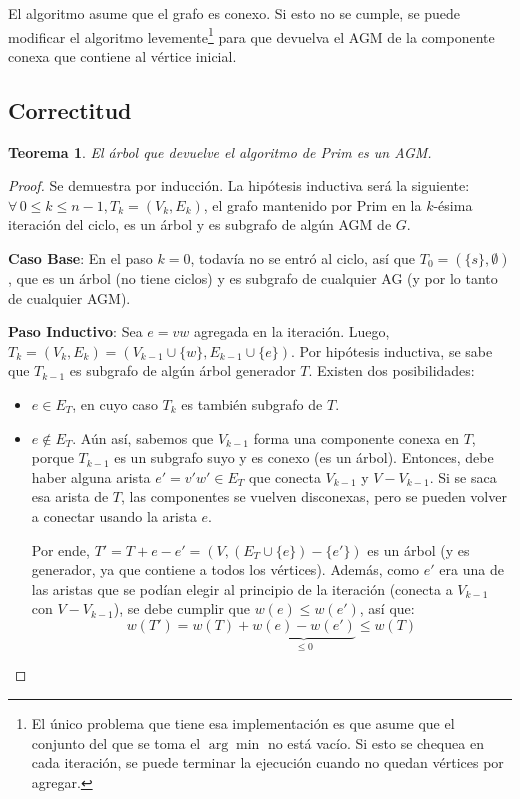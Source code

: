 \documentclass[a4paper]{report}
\newtheorem*{theorem*}{Teorema}
\begin{document}
El algoritmo asume que el grafo es conexo. Si esto no se cumple, se puede modificar el algoritmo levemente\footnote{El único problema que tiene esa implementación es que asume que el conjunto del que se toma el $\arg\min$ no está vacío. Si esto se chequea en cada iteración, se puede terminar la ejecución cuando no quedan vértices por agregar.} para que devuelva el AGM de la componente conexa que contiene al vértice inicial.

\subsection{Correctitud}

\begin{theorem*}
    El árbol que devuelve el algoritmo de Prim es un AGM.
\end{theorem*}
\begin{proof}
    Se demuestra por inducción. La hipótesis inductiva será la siguiente: $\forall\,0 \leq k \leq n - 1, T_k = (V_k, E_k)$, el grafo mantenido por Prim en la $k$-ésima iteración del ciclo, es un árbol y es subgrafo de algún AGM de $G$.

    \textbf{Caso Base}: En el paso $k = 0$, todavía no se entró al ciclo, así que $T_0 = (\{s\}, \emptyset)$, que es un árbol (no tiene ciclos) y es subgrafo de cualquier AG (y por lo tanto de cualquier AGM).

    \textbf{Paso Inductivo}: Sea $e = vw$ agregada en la iteración. Luego, $T_k = (V_k, E_k) = (V_{k - 1} \cup \{w\}, E_{k - 1} \cup \{e\})$. Por hipótesis inductiva, se sabe que $T_{k - 1}$ es subgrafo de algún árbol generador $T$. Existen dos posibilidades:
    \begin{itemize}
        \item $e \in E_T$, en cuyo caso $T_k$ es también subgrafo de $T$.
        \item $e \notin E_T$. Aún así, sabemos que $V_{k - 1}$ forma una componente conexa en $T$, porque $T_{k - 1}$ es un subgrafo suyo y es conexo (es un árbol). Entonces, debe haber alguna arista $e' = v'w' \in E_T$ que conecta $V_{k - 1}$ y $V - V_{k - 1}$. Si se saca esa arista de $T$, las componentes se vuelven disconexas, pero se pueden volver a conectar usando la arista $e$.

              Por ende, $T' = T + e - e' = (V, (E_T \cup \{e\}) - \{e'\})$ es un árbol (y es generador, ya que contiene a todos los vértices). Además, como $e'$ era una de las aristas que se podían elegir al principio de la iteración (conecta a $V_{k - 1}$ con $V - V_{k - 1}$), se debe cumplir que $w(e) \leq w(e')$, así que:
              $$w(T') = w(T) + \underbrace{w(e) - w(e')}_{\leq 0} \leq w(T)$$


\end{itemize}
\end{proof}
\end{document}
